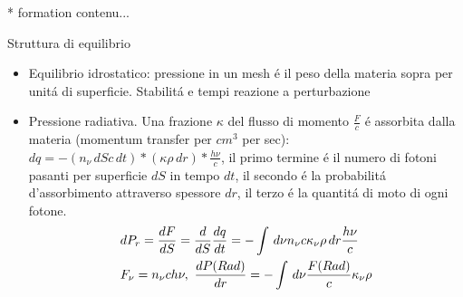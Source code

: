 \begin{frame}{* formation}
	contenu...
\end{frame}

\frameinlbftrue
\begin{frame}[fragile]{Struttura di equilibrio}

\begin{itemize}
\item Equilibrio idrostatico: pressione in un mesh \'e il peso della materia sopra per unit\'a di superficie. Stabilit\'a e tempi reazione a perturbazione
\item Pressione radiativa. Una frazione $\kappa$ del flusso di momento $\frac{F}{c}$ \'e assorbita dalla materia (momentum transfer per $cm^3$ per sec): $dq=-(n_{\nu}\,dSc\,dt)*(\kappa\rho\,dr)*\frac{h\nu}{c}$, il primo termine \'e il numero di fotoni pasanti per superficie $dS$ in tempo $dt$, il secondo \'e la probabilit\'a d'assorbimento attraverso spessore $dr$, il terzo \'e la quantit\'a di moto di ogni fotone.
\begin{align*}
&dP_r=\TDy{S}{F}=\TDof{S}\TDy{t}{q}=-\int \,d\nu n_{\nu}c\kappa_{\nu}\rho\,dr\frac{h\nu}{c}\\
&F_{\nu}=n_{\nu}ch\nu,\ \TDy{r}{P(Rad)}=-\int\,d\nu\frac{F(Rad)}{c}\kappa_{\nu}\rho
\end{align*}
\begin{comment}
Un elemento di volume $dS\,dr$ subisce per effetto dell'assorbimento della radiazione una variazione d'impulso $dq$, nel caso un fotone venga assorbito la variazione del flusso uscente \'e $dF<0$
The distribution of photons over over different quantum states with energies $\epsilon_k=\hbar\omega_k$ (large volume $\omega_k\to\omega$) 
\begin{align*}
\overline{n_k}=\frac{1}{\exp{\frac{\hbar\omega}{KT}}-1}
\end{align*}
Moltiplicando il numero di stati nel dato range di frequenze per la distribuzione di Plank (numero di occupazione) ottengo il numero di fotoni e l'energia radiativa nel range di frequenza
\begin{align*}
&dN_{\omega}=\frac{V}{\pi^2c^3}\frac{\omega^2\,d\omega}{\exp{\frac{\hbar\omega}{KT}}-1}\\
&dE_{\omega}=\frac{V\hbar}{\pi^2c^3}\frac{\omega^3\,d\omega}{\exp{\frac{\hbar\omega}{KT}}-1}
\end{align*}
\end{comment}
\end{itemize}

\end{frame}
\frameinlbffalse


